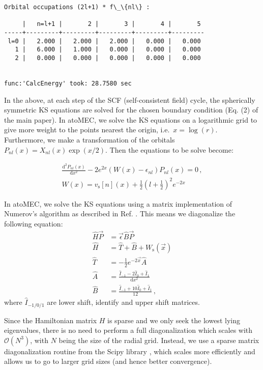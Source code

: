 \documentclass[11pt]{article}
\begin{document}
\begin{Verbatim}[commandchars=\\\{\}]
Orbital occupations (2l+1) * f\_\{nl\} :

     |   n=l+1 |       2 |       3 |       4 |       5
-----+---------+---------+---------+---------+---------
 l=0 |   2.000 |   2.000 |   2.000 |   0.000 |   0.000
   1 |   6.000 |   1.000 |   0.000 |   0.000 |   0.000
   2 |   0.000 |   0.000 |   0.000 |   0.000 |   0.000


func:'CalcEnergy' took: 28.7580 sec
    \end{Verbatim}

    In the above, at each step of the SCF (self-consistent field) cycle, the
spherically symmetric KS equations are solved for the chosen boundary
condition (Eq. (2) of the main paper). In atoMEC, we solve the KS
equations on a logarithmic grid to give more weight to the points
nearest the origin, i.e.~\(x=\log(r)\). Furthermore, we make a
transformation of the orbitals \(P_{nl}(x) = X_{nl}(x)\exp(x/2)\). Then
the equations to be solve become:

\begin{gather}
\frac{\textrm{d}^2 P_{nl}(x)}{\textrm{d}x^2} - 2e^{2x}(W(x)-\epsilon_{nl})P_{nl}(x)=0\,,\\
W(x) = v_\textrm{s}[n](x) + \frac{1}{2}\left(l+\frac{1}{2}\right)^2 e^{-2x}
\end{gather}

In atoMEC, we solve the KS equations using a matrix implementation of
Numerov's algorithm as described in Ref. .
This means we diagonalize the following equation: \begin{align}
\hat{H}\vec{P} &= \vec{\epsilon} \hat{B} \vec{P} \\
\hat{H} &= \hat{T} + \hat{B} + W_\textrm{s}(\vec{x}) \\
\hat{T} &= -\frac{1}{2} e^{-2\vec{x}} \hat{A} \\
\hat{A} &= \frac{\hat{I}_{-1} -2\hat{I}_0 + \hat{I}_1}{\textrm{d}x^2} \\
\hat{B} &= \frac{\hat{I}_{-1} +10\hat{I}_0 + \hat{I}_1}{12}\,,
\end{align} where \(\hat{I}_{-1/0/1}\) are lower shift, identify and
upper shift matrices.

Since the Hamiltonian matrix \(H\) is sparse and we only seek the lowest
lying eigenvalues, there is no need to perform a full diagonalization
which scales with \(\mathcal{O}(N^3)\), with \(N\) being the size of the
radial grid. Instead, we use a sparse matrix diagonalization routine
from the Scipy library \cite{scipy}, which scales more efficiently and
allows us to go to larger grid sizes (and hence better convergence).
\end{document}
